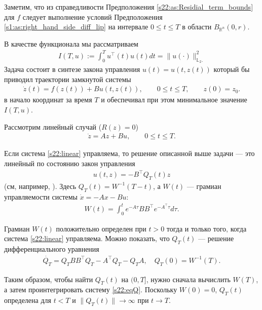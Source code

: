\documentclass[../main.tex]{subfiles}
\begin{document}
Заметим, что из справедливости Предположения \ref{s22:as:Residial_term_bounds} для $f$ следует выполнение условий Предположения \ref{s1:as:right_hand_side_diff_lip} на интервале $ 0 \leqslant t \leqslant T$ в области $B_{\mathbb{R}^n}(0,r)$.

В качестве функционала мы рассматриваем 
\begin{gather}\label{s22:cost}
        I(T,u):=\int_0^Tu^\top (t)u(t)dt=     \lVert u(\cdot)\rVert^2_{\mathbb{L}_2.} 
\end{gather}
Задача состоит в синтезе закона управления $u(t)=u(t,z(t))$ который бы приводил траектории замкнутой системы  
\begin{gather*}
    \dot{z}(t)=f(z(t))+B u(t,z(t)),\qquad 0 \leqslant t \leqslant T, \qquad z(0) = z_0.
\end{gather*}
в начало координат за время $T$ и обеспечивал при этом минимальное значение $I(T,u)$. 

Рассмотрим линейный случай ($R(z)=0$)
\begin{gather}\label{s22:linear}
    \dot{z} =  A  z + B u, \qquad 0 \leqslant t \leqslant T.
\end{gather}

Если система \eqref{s22:linear} управляема, то решение описанной выше задачи --- это линейный по состоянию закон управления 
\begin{gather}\label{s22:linear_feedback}
    u(t,z) = -B^{\top} Q_T(t) z
\end{gather}
(см, например, \cite{Abgar,Kur1,GusevOsipov}).
Здесь $Q_T(t)=W^{-1}(T-t)$, а $W(t)$ --- грамиан управляемости системы $\dot{x} = -A x - B u$:
\begin{gather*}
    W(t) = \int_0^t e^{-A\tau}BB^\top e^{-A^{\top}\tau}d\tau. 
\end{gather*}

Грамиан $W(t)$ положительно определен при $t>0$ тогда и только того, когда   
система \eqref{s22:linear} управляема. 
Можно показать, что $Q_T(t)$ --- решение дифференциального уравнения 
\begin{gather}\label{s22:eqQ}
    \dot{Q_T}  = Q_T B B^{\top} Q_T - A^{\top}Q_T - Q_T A, \quad Q_T(0)=W^{-1}(T).
\end{gather}

Таким образом, чтобы найти $Q_T(t)$ на $(0,T]$, нужно сначала вычислить $W(T)$, а затем проинтегрировать систему \eqref{s22:eqQ}.
Поскольку $W(0)=0$, $Q_T(t)$ определена для $t<T$ и $\|Q_T(t)\| \to \infty$ при $t\to T$. 
\end{document}
